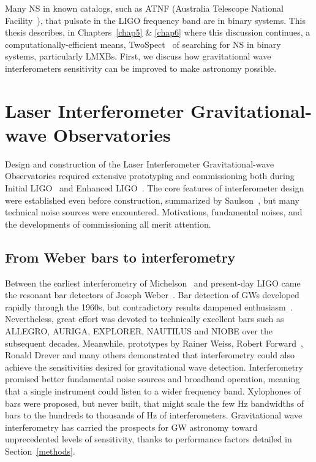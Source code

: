 Many NS in known catalogs, such as ATNF (Australia Telescope National Facility~\cite{ManchesterATNF2005}), that pulsate in the LIGO frequency band are in binary systems.
This thesis describes, in Chapters~\ref{chap5} \& \ref{chap6} where this discussion continues, a computationally-efficient means, TwoSpect~\cite{GoetzTwoSpectMethods2011} of searching for NS in binary systems, particularly LMXBs. 
First, we discuss how gravitational wave interferometers sensitivity can be improved to make astronomy possible.

    \section{Laser Interferometer Gravitational-wave Observatories}
    \label{LIGO}
        
Design and construction of the Laser Interferometer Gravitational-wave Observatories required extensive prototyping and commissioning both during Initial LIGO~\cite{MavalvalaThesis,AdhikariThesis,BallmerThesis} and Enhanced LIGO~\cite{FrickeThesis,SmithThesis,DooleyThesis}.
The core features of interferometer design were established even before construction, summarized by Saulson~\cite{Saulson}, but many technical noise sources were encountered.
Motivations, fundamental noises, and the developments of commissioning all merit attention.


        \subsection{From Weber bars to interferometry}
        \label{bars_to_interferometry}

Between the earliest interferometry of Michelson~\cite{michelson} and present-day LIGO came the resonant bar detectors of Joseph Weber~\cite{Weber1960}.
Bar detection of GWs developed rapidly through the 1960s, but contradictory results dampened enthusiasm~\cite{Saulson,CollinsGravityShadow}.
Nevertheless, great effort was devoted to technically excellent bars such as ALLEGRO, AURIGA, EXPLORER, NAUTILUS and NIOBE over the subsequent decades.
Meanwhile, prototypes by Rainer Weiss, Robert Forward~\cite{Forward1978}, Ronald Drever and many others demonstrated that interferometry could also achieve the sensitivities desired for gravitational wave detection.
Interferometry promised better fundamental noise sources and broadband operation, meaning that a single instrument could listen to a wider frequency band.
Xylophones of bars were proposed, but never built, that might scale the few Hz bandwidths of bars to the hundreds to thousands of Hz of interferometers.
Gravitational wave interferometry has carried the prospects for GW astronomy toward unprecedented levels of sensitivity, thanks to performance factors detailed in Section~\ref{methods}.

